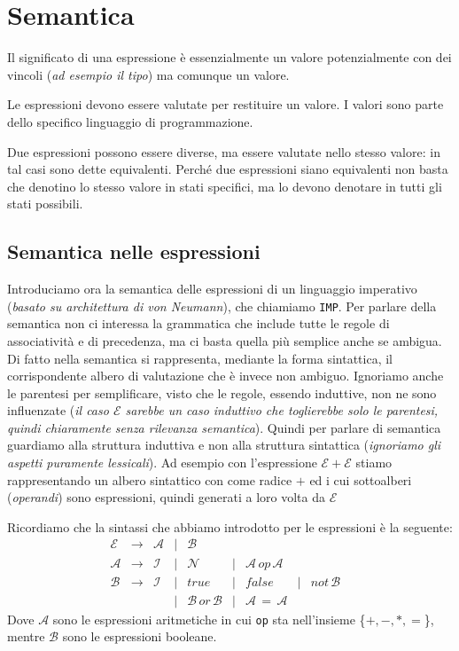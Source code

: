 \documentclass[oneside,a4paper,11pt]{book}
\theoremstyle{italicstyle}
\theoremstyle{normStyle}
\begin{document}
\section{Semantica}
Il significato di una espressione è essenzialmente un valore potenzialmente con 
dei vincoli (\textit{ad esempio il tipo}) ma comunque un valore. 

Le espressioni devono essere valutate per restituire un valore. I valori 
sono parte dello specifico linguaggio di programmazione. 

Due espressioni possono essere diverse, ma essere valutate nello stesso valore: in 
tal casi sono dette equivalenti. Perché due espressioni siano equivalenti non basta 
che denotino lo stesso valore in stati specifici, ma lo devono denotare in tutti gli 
stati possibili.
\subsection{Semantica nelle espressioni}
Introduciamo ora la semantica delle espressioni di un linguaggio 
imperativo (\textit{basato su architettura di von Neumann}), che chiamiamo 
\verb|IMP|. Per parlare della semantica non ci interessa la grammatica 
che include tutte le regole di associatività e di precedenza, ma 
ci basta quella più semplice anche se ambigua. Di fatto nella semantica
si rappresenta, mediante la forma sintattica, il corrispondente albero
di valutazione che è invece non ambiguo. Ignoriamo anche le parentesi
per semplificare, visto che le regole, essendo induttive, non ne sono
influenzate (\textit{il caso $\mathcal{E}$ sarebbe un caso induttivo che toglierebbe 
solo le parentesi, quindi chiaramente senza rilevanza semantica}).
Quindi per parlare di semantica guardiamo alla struttura induttiva e 
non alla struttura sintattica (\textit{ignoriamo gli aspetti puramente lessicali}). 
Ad esempio con l’espressione $\mathcal{E} + \mathcal{E}$ stiamo rappresentando un albero
sintattico con come radice $+$ ed i cui sottoalberi (\textit{operandi}) sono 
espressioni, quindi generati a loro volta da $\mathcal{E}$

Ricordiamo che la sintassi che abbiamo introdotto per le espressioni è la seguente:
\[
\begin{matrix}
  \mathcal{E} & \longrightarrow & \mathcal{A}& | &\mathcal{B} & & & & & \\
  \mathcal{A} & \longrightarrow & \mathcal{I} &| & \mathcal{N} &
  | & \mathcal{A} \,op\,\mathcal{A} & & & \\
  \mathcal{B} & \longrightarrow & \mathcal{I} &| & true & | & false & | &
  not\,\mathcal{B} & \\
  & & & | & \mathcal{B} \,or\,\mathcal{B} & | & \mathcal{A} \,=\,\mathcal{A}
\end{matrix}
\]
Dove $\mathcal{A}$ sono le espressioni aritmetiche in cui \verb|op| sta nell'insieme 
\{$+,-,*,=$\}, mentre $\mathcal{B}$ sono le espressioni booleane.
\end{document}
